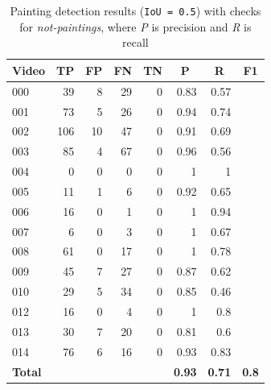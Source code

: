\documentclass[10pt,twocolumn,letterpaper]{article}
\begin{document}
\begin{table}[]
\begin{center}
\begin{tabular}{lrrrrrrr}
\multicolumn{1}{c}{\textbf{Video}} & \multicolumn{1}{c}{\textbf{TP}} & \multicolumn{1}{c}{\textbf{FP}} & \multicolumn{1}{c}{\textbf{FN}} & \multicolumn{1}{c}{\textbf{TN}} & \multicolumn{1}{c}{\textbf{P}} & \multicolumn{1}{c}{\textbf{R}} & \multicolumn{1}{c}{\textbf{F1}} \\ \hline \hline
000 & 39 & 8 & 29 & 0 & 0.83 & 0.57 &  \\
001 & 73 & 5 & 26 & 0 & 0.94 & 0.74 &  \\
002 & 106 & 10 & 47 & 0 & 0.91 & 0.69 &  \\
003 & 85 & 4 & 67 & 0 & 0.96 & 0.56 &  \\
004 & 0 & 0 & 0 & 0 & 1 & 1 &  \\
005 & 11 & 1 & 6 & 0 & 0.92 & 0.65 &  \\
006 & 16 & 0 & 1 & 0 & 1 & 0.94 &  \\
007 & 6 & 0 & 3 & 0 & 1 & 0.67 &  \\
008 & 61 & 0 & 17 & 0 & 1 & 0.78 &  \\
009 & 45 & 7 & 27 & 0 & 0.87 & 0.62 &  \\
010 & 29 & 5 & 34 & 0 & 0.85 & 0.46 &  \\
012 & 16 & 0 & 4 & 0 & 1 & 0.8 &  \\
013 & 30 & 7 & 20 & 0 & 0.81 & 0.6 &  \\
014 & 76 & 6 & 16 & 0 & 0.93 & 0.83 &  \\ \hline \hline
\textbf{Total} &  &  &  &  & \textbf{0.93} &\textbf{ 0.71} & \textbf{0.8} \\
\end{tabular}
\end{center}
\caption{Painting detection results (\texttt{IoU = 0.5}) with checks for \textit{not-paintings}, where \textit{P} is precision and \textit{R} is recall}
\label{tab:PaintingDetectionResults1}
\end{table}
\end{document}

